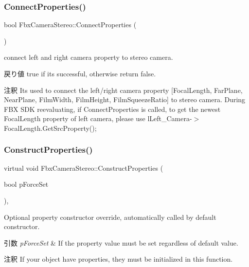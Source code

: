 \subsubsection{\texorpdfstring{Connect\+Properties()}{ConnectProperties()}}
{\footnotesize\ttfamily bool Fbx\+Camera\+Stereo\+::\+Connect\+Properties (\begin{DoxyParamCaption}{ }\end{DoxyParamCaption})}

connect left and right camera property to stereo camera. \begin{DoxyReturn}{戻り値}
true if it\textquotesingle{}s successful, otherwise return false. 
\end{DoxyReturn}
\begin{DoxyRemark}{注釈}
It\textquotesingle{}s used to connect the left/right camera property \mbox{[}Focal\+Length, Far\+Plane, Near\+Plane, Film\+Width, Film\+Height, Film\+Squeeze\+Ratio\mbox{]} to stereo camera. During F\+BX S\+DK reevaluating, if Connect\+Properties is called, to get the newest Focal\+Length property of left camera, please use l\+Left\+\_\+\+Camera-\/$>$Focal\+Length.\+Get\+Src\+Property(); 
\end{DoxyRemark}
\mbox{\label{class_fbx_camera_stereo_a83a9b1ee59d0014b30411fe4877b5dec}} 
\subsubsection{\texorpdfstring{Construct\+Properties()}{ConstructProperties()}}
{\footnotesize\ttfamily virtual void Fbx\+Camera\+Stereo\+::\+Construct\+Properties (\begin{DoxyParamCaption}\item[{bool}]{p\+Force\+Set }\end{DoxyParamCaption})\hspace{0.3cm}{\ttfamily [protected]}, {\ttfamily [virtual]}}

Optional property constructor override, automatically called by default constructor. 
\begin{DoxyParams}{引数}
{\em p\+Force\+Set} & If the property value must be set regardless of default value. \\
\hline
\end{DoxyParams}
\begin{DoxyRemark}{注釈}
If your object have properties, they must be initialized in this function. 
\end{DoxyRemark}


